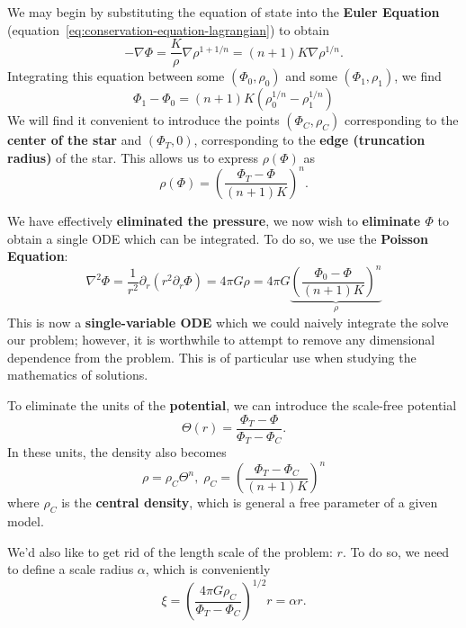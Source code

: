 We may begin by substituting the equation of state into the \textbf{Euler Equation} (equation~\ref{eq:conservation-equation-lagrangian}) to obtain
\[
- \nabla \Phi = \frac{K}{\rho} \nabla \rho^{1+1/n} = (n+1)K \nabla \rho^{1/n}.
\]
 Integrating this equation between some $(\Phi_0,\rho_0)$ and some $(\Phi_1,\rho_1)$, we find
\begin{equation}
    \Phi_1 - \Phi_0 = (n+1)K \left(\rho_{0}^{1/n} - \rho_1^{1/n}\right)
\end{equation}
We will find it convenient to introduce the points $(\Phi_C,\rho_C)$ corresponding to the \textbf{center of the star} and 
$(\Phi_T,0)$, corresponding to the \textbf{edge (truncation radius)} of the star. This allows us to express $\rho(\Phi)$ as 
\[
\rho(\Phi) = \left(\frac{\Phi_T-\Phi}{(n+1)K}\right)^n.
\]
\par
We have effectively \textbf{eliminated the pressure}, we now wish to \textbf{eliminate $\Phi$} to obtain a single ODE which can be integrated. To do so, we use the \textbf{Poisson Equation}:
\[
\nabla^2 \Phi = \frac{1}{r^2} \partial_r \left(r^2\partial_r \Phi\right) = 4\pi G \rho = 4\pi G\underbrace{\left(\frac{\Phi_0-\Phi}{(n+1)K}\right)^n}_{\rho}
\]
This is now a \textbf{single-variable ODE} which we could naively integrate the solve our problem; however, it is worthwhile to attempt to remove any dimensional dependence from the problem. This is of particular use when studying the mathematics of solutions.
\par
To eliminate the units of the \textbf{potential}, we can introduce the scale-free potential
\[
\Theta(r) = \frac{\Phi_T-\Phi}{\Phi_T-\Phi_C}.
\]
 In these units, the density also becomes
\begin{equation}
\label{eq:LE-density}
\boxed{
\rho = \rho_C \Theta^n,\;\rho_C = \left(\frac{\Phi_T-\Phi_C}{(n+1)K}\right)^n
}
\end{equation}
where $\rho_C$ is the \textbf{central density}, which is general a free parameter of a given model.
\par
We'd also like to get rid of the length scale of the problem: $r$. To do so, we need to define a scale radius $\alpha$, which is conveniently
\begin{equation}
    \label{eq:LE-length}
    \boxed{
    \xi = \left(\frac{4\pi G \rho_C}{\Phi_T-\Phi_C}\right)^{1/2} r = \alpha r.
    }
\end{equation}
